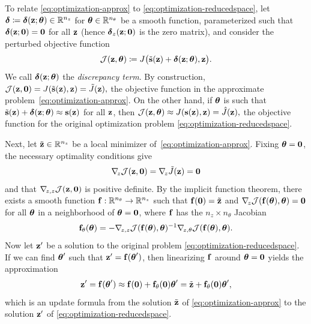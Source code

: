 To relate \cref{eq:optimization-approx} to \cref{eq:optimization-reducedspace}, let $\boldsymbol{\delta} \coloneqq \boldsymbol{\delta}(\mathbf{z};\boldsymbol{\theta})\in\mathbb{R}^{n_z}$ for $\boldsymbol{\theta}\in\mathbb{R}^{n_\theta}$ be a smooth function, parameterized such that $\boldsymbol{\delta}(\mathbf{z};\mathbf{0}) = \mathbf{0}$ for all $\mathbf{z}$ (hence $\boldsymbol{\delta}_z(\mathbf{z};\mathbf{0})$ is the zero matrix), and consider the perturbed objective function
\begin{align}
    \label{eq:optimization-discrepancy}
    \mathcal{J}(\mathbf{z}, \boldsymbol{\theta})
    \coloneqq J\big(\tilde{\mathbf{s}}(\mathbf{z}) + \boldsymbol{\delta}(\mathbf{z};\boldsymbol{\theta}), \mathbf{z}\big).
\end{align}
We call $\boldsymbol{\delta}(\mathbf{z};\boldsymbol{\theta})$ the \emph{discrepancy term}.
By construction,
$
    \mathcal{J}(\mathbf{z},\mathbf{0})
    = J(\tilde{\mathbf{s}}(\mathbf{z}),\mathbf{z})
    = \tilde{J}(\mathbf{z}),
$
the objective function in the approximate problem~\cref{eq:optimization-approx}.
On the other hand, if $\boldsymbol{\theta}$ is such that $\tilde{\mathbf{s}}(\mathbf{z}) + \boldsymbol{\delta}(\mathbf{z};\boldsymbol{\theta}) \approx \mathbf{s}(\mathbf{z})$ for all $\mathbf{z}$, then
$
    \mathcal{J}(\mathbf{z}, \boldsymbol{\theta})
    \approx
    J(\mathbf{s}(\mathbf{z}), \mathbf{z})
    = \hat{J}(\mathbf{z}),
$
the objective function for the original optimization problem \cref{eq:optimization-reducedspace}.

Next, let $\tilde{\mathbf{z}}\in\mathbb{R}^{n_z}$ be a local minimizer of~\cref{eq:optimization-approx}.
Fixing $\boldsymbol{\theta} = \mathbf{0}$, the necessary optimality conditions give
\begin{align*}
    \nabla_{\!z}\mathcal{J}(\mathbf{z},\mathbf{0})
    = \nabla_{\!z}\tilde{J}(\mathbf{z})
    = \mathbf{0}
\end{align*}
and that $\nabla_{\!z,z}\mathcal{J}(\mathbf{z},\mathbf{0})$ is positive definite.
By the implicit function theorem, there exists a smooth function $\mathbf{f}:\mathbb{R}^{n_\theta}\to\mathbb{R}^{n_z}$ such that $\mathbf{f}(\mathbf{0}) = \tilde{\mathbf{z}}$ and $\nabla_{\!z}\mathcal{J}(\mathbf{f}(\boldsymbol{\theta}), \boldsymbol{\theta}) = \mathbf{0}$ for all $\boldsymbol{\theta}$ in a neighborhood of $\boldsymbol{\theta} = \mathbf{0}$, where $\mathbf{f}$ has the $n_z \times n_\theta$ Jacobian
\begin{align}
    \label{eq:theta-jacobian}
    \mathbf{f}_\theta(\boldsymbol{\theta})
    = - \nabla_{\!z,z}\mathcal{J}(\mathbf{f}(\boldsymbol{\theta}), \boldsymbol{\theta})^{-1}\nabla_{\!z,\theta}\mathcal{J}(\mathbf{f}(\boldsymbol{\theta}), \boldsymbol{\theta}).
\end{align}
Now let $\mathbf{z}'$ be a solution to the original problem \cref{eq:optimization-reducedspace}.
If we can find $\boldsymbol{\theta}'$ such that $\mathbf{z}' = \mathbf{f}(\boldsymbol{\theta}')$, then linearizing $\mathbf{f}$ around $\boldsymbol{\theta} = \mathbf{0}$ yields the approximation
\begin{align}
    \label{eq:control-update}
    \mathbf{z}'
    = \mathbf{f}(\boldsymbol{\theta}')
    \approx \mathbf{f}(\mathbf{0}) + \mathbf{f}_\theta(\mathbf{0})\boldsymbol{\theta}'
    = \tilde{\mathbf{z}} + \mathbf{f}_\theta(\mathbf{0})\boldsymbol{\theta}',
\end{align}
which is an update formula from the solution $\tilde{\mathbf{z}}$ of \cref{eq:optimization-approx} to the solution $\mathbf{z}'$ of \cref{eq:optimization-reducedspace}.

